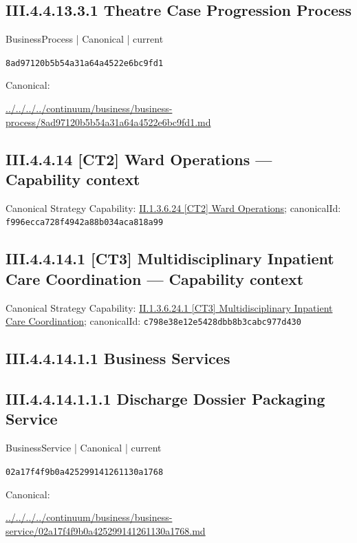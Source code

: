\documentclass[10pt,a4paper]{article}
\begin{document}
\subsection*{III.4.4.13.3.1 Theatre Case Progression Process}
\label{element-8ad97120b5b54a31a64a4522e6bc9fd1}
{\small BusinessProcess | Canonical | current}\par
\texttt{8ad97120b5b54a31a64a4522e6bc9fd1}\par
Canonical: \par
{\footnotesize\url{../../../../continuum/business/business-process/8ad97120b5b54a31a64a4522e6bc9fd1.md}}\par
\subsection*{III.4.4.14 [CT2] Ward Operations — Capability context}
Canonical Strategy Capability: \hyperref[element-f996ecca728f4942a88b034aca818a99]{II.1.3.6.24 [CT2] Ward Operations}; canonicalId: \texttt{f996ecca728f4942a88b034aca818a99}\par
\subsection*{III.4.4.14.1 [CT3] Multidisciplinary Inpatient Care Coordination — Capability context}
Canonical Strategy Capability: \hyperref[element-c798e38e12e5428dbb8b3cabc977d430]{II.1.3.6.24.1 [CT3] Multidisciplinary Inpatient Care Coordination}; canonicalId: \texttt{c798e38e12e5428dbb8b3cabc977d430}\par
\subsection*{III.4.4.14.1.1 Business Services}
\subsection*{III.4.4.14.1.1.1 Discharge Dossier Packaging Service}
\label{element-02a17f4f9b0a425299141261130a1768}
{\small BusinessService | Canonical | current}\par
\texttt{02a17f4f9b0a425299141261130a1768}\par
Canonical: \par
{\footnotesize\url{../../../../continuum/business/business-service/02a17f4f9b0a425299141261130a1768.md}}\par
\end{document}
